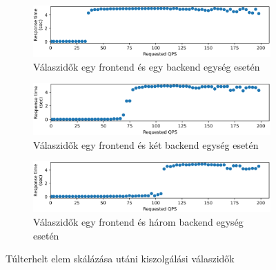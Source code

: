 \begin{figure}
\centering
\begin{subfigure}{\textwidth}
    \includegraphics[width=\textwidth]{figures/analitic-model/1FE-1BE.png}
    \caption{Válaszidők egy frontend és egy backend egység esetén}
    \label{subfig:model-1FE-1BE}
\end{subfigure}

\hfill
\begin{subfigure}{\textwidth}
    \includegraphics[width=\textwidth]{figures/analitic-model/1FE-2BE.png}
    \caption{Válaszidők egy frontend és két backend egység esetén}
    \label{subfig:model-1FE-2BE}
\end{subfigure}

\hfill
\begin{subfigure}{\textwidth}
    \includegraphics[width=\textwidth]{figures/analitic-model/1FE-3BE.png}
    \caption{Válaszidők egy frontend és három backend egység esetén}
    \label{subfig:model-1FE-3BE}
\end{subfigure}

        
\caption{Túlterhelt elem skálázása utáni kiszolgálási válaszidők}
\label{fig:analitic-model}
\end{figure}






